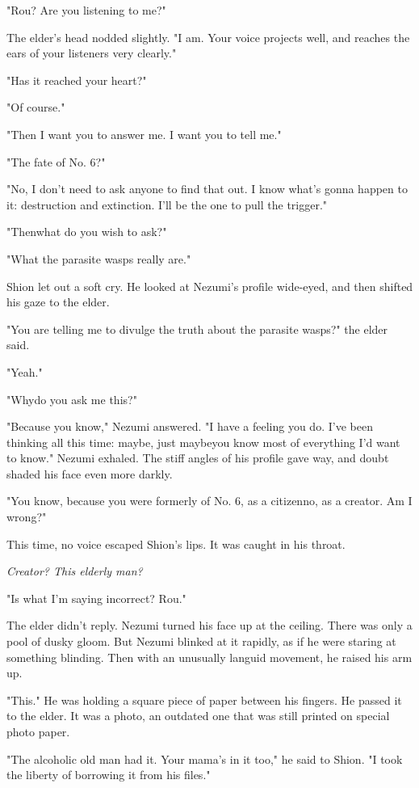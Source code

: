 "Rou? Are you listening to me?"

The elder's head nodded slightly. "I am. Your voice projects well, and
reaches the ears of your listeners very clearly."

"Has it reached your heart?"

"Of course."

"Then I want you to answer me. I want you to tell me."

"The fate of No. 6?"

"No, I don't need to ask anyone to find that out. I know what's gonna
happen to it: destruction and extinction. I'll be the one to pull the
trigger."

"Then\el what do you wish to ask?"

"What the parasite wasps really are."

Shion let out a soft cry. He looked at Nezumi's profile wide-eyed, and
then shifted his gaze to the elder.

"You are telling me to divulge the truth about the parasite wasps?" the
elder said.

"Yeah."

"Why\el do you ask me this?"

"Because you know," Nezumi answered. "I have a feeling you do. I've been
thinking all this time: maybe, just maybe\el you know most of everything
I'd want to know." Nezumi exhaled. The stiff angles of his profile gave
way, and doubt shaded his face even more darkly.

"You know, because you were formerly of No. 6, as a citizen\el no, as a
creator. Am I wrong?"

This time, no voice escaped Shion's lips. It was caught in his throat.

\emph{Creator? This elderly man?}

"Is what I'm saying incorrect? Rou."

The elder didn't reply. Nezumi turned his face up at the ceiling. There
was only a pool of dusky gloom. But Nezumi blinked at it rapidly, as if
he were staring at something blinding. Then with an unusually languid
movement, he raised his arm up.

"This." He was holding a square piece of paper between his fingers. He
passed it to the elder. It was a photo, an outdated one that was still
printed on special photo paper.

"The alcoholic old man had it. Your mama's in it too," he said to Shion.
"I took the liberty of borrowing it from his files."

